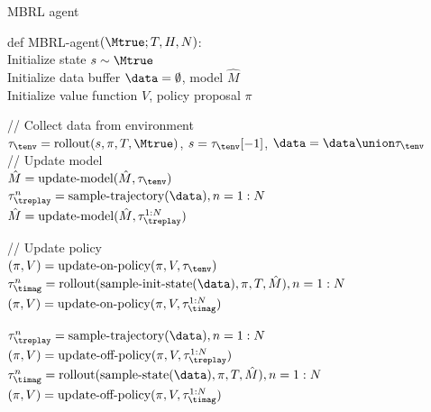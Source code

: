 \begin{algorithm}
\dontprintsemicolon
\caption{MBRL agent}
\label{algo:MBRL}
def MBRL-agent$(\Mtrue; T, H, N)$: \\
Initialize state $s \sim \Mtrue$ \\
Initialize data buffer $\data=\emptyset$, model $\hat{M}$ \\
Initialize value function $V$, policy proposal $\pi$\\
       {
       // Collect data from environment \\
         $\tau_{\tenv} = \text{rollout}(s, \pi, T, \Mtrue)$, \;
      $s = \tau_{\tenv}[-1]$, \;
      $\data = \data \union \tau_{\tenv}$ \\
      // Update model \\
            {
        $\hat{M} = \text{update-model}(\hat{M}, \tau_{\tenv})$\\
              }
              {
                $\tau_{\treplay}^{n} =\text{sample-trajectory}(\data), n=1:N$ \\
                $\hat{M} = \text{update-model}(\hat{M}, \tau_{\treplay}^{1:N})$\\
              }

   // Update policy \\
                 {
                   $(\pi,V)=\text{update-on-policy}(\pi,V,\tau_{\tenv})$\\
                 }
                    {
                      $\tau_{\timag}^{n}=\text{rollout}(\text{sample-init-state}(\data),\pi,T,\hat{M}), n=1:N$ \\
           $(\pi,V)=\text{update-on-policy}(\pi,V,\tau_{\timag}^{1:N})$ 
           }

           {
             $\tau_{\treplay}^{n} =\text{sample-trajectory}(\data), n=1:N$ \\
             $(\pi,V)=\text{update-off-policy}(\pi,V,\tau_{\treplay}^{1:N})$\\
           }
           {
             $\tau_{\timag}^{n}=\text{rollout}(\text{sample-state}(\data),\pi,T,\hat{M}), n=1:N$ \\
              $(\pi,V)=\text{update-off-policy}(\pi,V,\tau_{\timag}^{1:N})$\\
            }

}
\end{algorithm}



